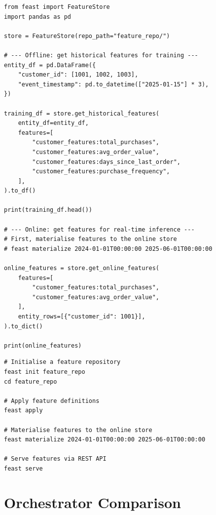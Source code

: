 \begin{codeblock}[title=\textbf{Using Feast for training and serving}]
\begin{verbatim}
from feast import FeatureStore
import pandas as pd

store = FeatureStore(repo_path="feature_repo/")

# --- Offline: get historical features for training ---
entity_df = pd.DataFrame({
    "customer_id": [1001, 1002, 1003],
    "event_timestamp": pd.to_datetime(["2025-01-15"] * 3),
})

training_df = store.get_historical_features(
    entity_df=entity_df,
    features=[
        "customer_features:total_purchases",
        "customer_features:avg_order_value",
        "customer_features:days_since_last_order",
        "customer_features:purchase_frequency",
    ],
).to_df()

print(training_df.head())

# --- Online: get features for real-time inference ---
# First, materialise features to the online store
# feast materialize 2024-01-01T00:00:00 2025-06-01T00:00:00

online_features = store.get_online_features(
    features=[
        "customer_features:total_purchases",
        "customer_features:avg_order_value",
    ],
    entity_rows=[{"customer_id": 1001}],
).to_dict()

print(online_features)
\end{verbatim}
\end{codeblock}

\begin{codeblock}[title=\textbf{Feast CLI commands}]
\begin{verbatim}
# Initialise a feature repository
feast init feature_repo
cd feature_repo

# Apply feature definitions
feast apply

# Materialise features to the online store
feast materialize 2024-01-01T00:00:00 2025-06-01T00:00:00

# Serve features via REST API
feast serve
\end{verbatim}
\end{codeblock}

\section{Orchestrator Comparison}
\label{sec:orchestrator-comparison}

